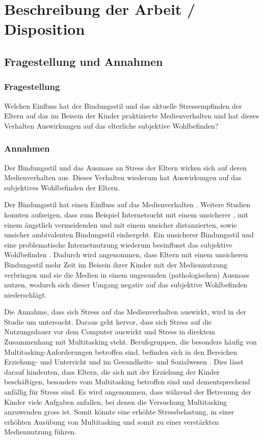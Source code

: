 \section{Beschreibung der Arbeit / Disposition}
\subsection{Fragestellung und Annahmen}
\subsubsection{Fragestellung}
Welchen Einfluss hat der Bindungsstil und das aktuelle Stressempfinden der Eltern auf das im Beisein der Kinder praktizierte Medienverhalten und hat dieses Verhalten Auswirkungen auf das elterliche subjektive Wohlbefinden?
\subsubsection{Annahmen}
Der Bindungsstil und das Ausmass an Stress der Eltern wirken sich auf deren Medienverhalten aus. Dieses Verhalten wiederum hat Auswirkungen auf das subjektives Wohlbefinden der Eltern.

Der Bindungsstil hat einen Einfluss auf das Medienverhalten \cite{Lin2015, Monacis2017}. Weitere Studien konnten aufzeigen, dass zum Beispiel Internetsucht mit einem unsicherer \cite{Lin2011, Severino2013}, mit einem ängstlich vermeidenden \cite{Shin2011} und mit einem unsicher distanzierten, sowie unsicher ambivalenten Bindungsstil \cite{Odaci2014} einhergeht. Ein unsicherer Bindungsstil und eine problematische Internetnutzung wiederum beeinflusst das subjektive Wohlbefinden \cite{Odaci2014}.	 
Dadurch wird angenommen, dass Eltern mit einem unsicheren Bindungsstil mehr Zeit im Beisein ihrer Kinder mit der Mediennutzung verbringen und sie die Medien in einem ungesunden (pathologischen) Ausmass nutzen, wodurch sich dieser Umgang negativ auf das subjektive Wohlbefinden niederschlägt.  

Die Annahme, dass sich Stress auf das Medienverhalten auswirkt, wird in der Studie um  untersucht. Daraus geht hervor, dass sich Stress auf die Nutzungsdauer vor dem Computer auswirkt und Stress in direktem Zusammenhang mit Multitasking steht. Berufsgruppen, die besonders häufig von Multitasking-Anforderungen betroffen sind, befinden sich in den Bereichen Erziehung- und Unterricht und im Gesundheits- und Sozialwesen \cite{Lohmann2012}. Dies lässt darauf hindeuten, dass Eltern, die sich mit der Erziehung der Kinder beschäftigen, besonders vom Multitasking betroffen sind und dementsprechend anfällig für Stress sind. Es wird angenommen, dass während der Betreuung der Kinder viele Aufgaben anfallen, bei denen die Versuchung Multitasking anzuwenden gross ist. Somit könnte eine erhöhte Stressbelastung, in einer erhöhten Ausübung von Multitasking und somit zu einer verstärkten Mediennutzung führen.

